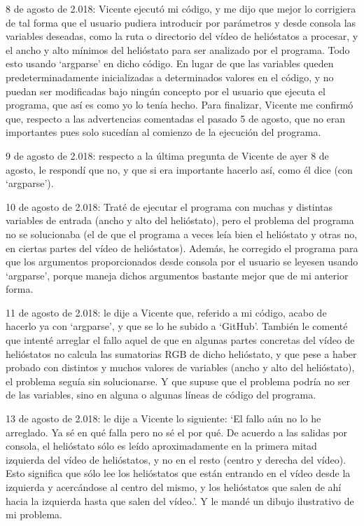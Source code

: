 8 de agosto de 2.018: Vicente ejecutó mi código, y me dijo que mejor lo corrigiera de tal forma que el usuario pudiera introducir por parámetros y desde consola las variables deseadas, como la ruta o directorio del vídeo de helióstatos a procesar, y el ancho y alto mínimos del helióstato para ser analizado por el programa. Todo esto usando ‘argparse’ en dicho código. En lugar de que las variables queden predeterminadamente inicializadas a determinados valores en el código, y no puedan ser modificadas bajo ningún concepto por el usuario que ejecuta el programa, que así es como yo lo tenía hecho. Para finalizar, Vicente me confirmó que, respecto a las advertencias comentadas el pasado 5 de agosto, que no eran importantes pues solo sucedían al comienzo de la ejecución del programa.

9 de agosto de 2.018: respecto a la última pregunta de Vicente de ayer 8 de agosto, le respondí que no, y que si era importante hacerlo así, como él dice (con ‘argparse’).

10 de agosto de 2.018: Traté de ejecutar el programa con muchas y distintas variables de entrada (ancho y alto del helióstato), pero el problema del programa no se solucionaba (el de que el programa a veces leía bien el helióstato y otras no, en ciertas partes del vídeo de helióstatos). Además, he corregido el programa para que los argumentos proporcionados desde consola por el usuario se leyesen usando ‘argparse’, porque maneja dichos argumentos bastante mejor que de mi anterior forma.

11 de agosto de 2.018: le dije a Vicente que, referido a mi código, acabo de hacerlo ya con ‘argparse’, y que se lo he subido a ‘GitHub’. También le comenté que intenté arreglar el fallo aquel de que en algunas partes concretas del vídeo de helióstatos no calcula las sumatorias RGB de dicho helióstato, y que pese a haber probado con distintos y muchos valores de variables (ancho y alto del helióstato), el problema seguía sin solucionarse. Y que supuse que el problema podría no ser de las variables, sino en alguna o algunas líneas de código del programa.

13 de agosto de 2.018: le dije a Vicente lo siguiente: ‘El fallo aún no lo he arreglado. Ya sé en qué falla pero no sé el por qué. De acuerdo a las salidas por consola, el helióstato sólo es leído aproximadamente en la primera mitad izquierda del vídeo de helióstatos, y no en el resto (centro y derecha del vídeo). Esto significa que sólo lee los helióstatos que están entrando en el vídeo desde la izquierda y acercándose al centro del mismo, y los helióstatos que salen de ahí hacia la izquierda hasta que salen del vídeo.’. Y le mandé un dibujo ilustrativo de mi problema.

